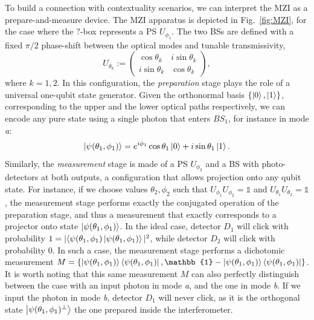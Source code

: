 \documentclass[a4paper,twocolumn,11pt,accepted=2024-01-17]{quantumarticle}
\begin{document}
To build a connection with contextuality scenarios, we can interpret the MZI as a prepare-and-measure device. The MZI apparatus is depicted in Fig.~\ref{fig:MZI}, for the case where the $?$-box represents a PS $U_{\phi_1}$. The two BSs are defined with a fixed $\pi/2$ phase-shift between the optical modes and tunable transmissivity,
\begin{equation}\label{eq: BS}
    U_{\theta_k} := \left(\begin{matrix}\cos\theta_k&i\sin\theta_k\\i\sin\theta_k&\cos\theta_k\end{matrix}\right),
\end{equation}
where $k=1,2$. In this configuration, the \textit{preparation} stage plays the role of a universal one-qubit state generator. Given the orthonormal basis $\{\ket{0},\ket{1}\}$, corresponding to the upper and the lower optical paths respectively, we can encode any pure state using a single photon that enters $BS_1$, for instance in mode \textit{a}:
\begin{align}\label{eq: state inside the interferometer}
    \ket{\psi(\theta_1,\phi_1)} = e^{i\phi_1}\cos\theta_1 \ket{0}+i\sin\theta_1\ket{1}.
\end{align}
Similarly, the \textit{measurement} stage is made of a PS $U_{\phi_2}$ and a BS with photo-detectors at both outputs, a configuration that allows projection onto any qubit state. For instance, if we choose values $\theta_2,\phi_2$ such that  $U_{\phi_1}U_{\phi_2}=\mathbb{1}$ and $U_{\theta_1}U_{\theta_2}=\mathbb{1}$, the measurement stage performs exactly the conjugated operation of the preparation stage, and thus a measurement that exactly corresponds to a projector onto state $\ket{\psi(\theta_1,\phi_1)}$. In the ideal case, detector $D_1$ will click with probability $1 = \vert \langle \psi(\theta_1,\phi_1)\ket{\psi(\theta_1,\phi_1)} \vert^2$, while detector $D_2$ will click with probability $0$. In such a case, the measurement stage performs a dichotomic measurement $M=\{\ket{\psi(\theta_1,\phi_1)}\bra{\psi(\theta_1,\phi_1)}, \mathbb{1}- \ket{\psi(\theta_1,\phi_1)}\bra{\psi(\theta_1,\phi_1)}\}$. It is worth noting that this same measurement $M$ can also perfectly distinguish between the case with an input photon in mode \textit{a}, and the one in mode \textit{b}. If we input the photon in mode \textit{b}, detector $D_1$ will never click, as it is the orthogonal state $\ket{\psi(\theta_1,\phi_1)^\perp}$ the one prepared inside the interferometer. 
\end{document}
